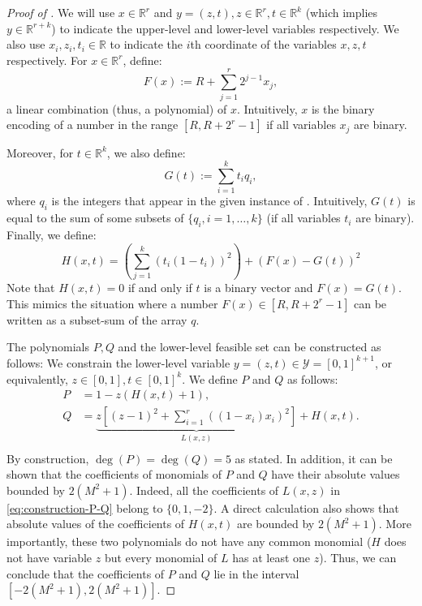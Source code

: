 \documentclass{article}
\newcommand*{\cY}{\mathcal{Y}}
\newcommand*{\RR}{\mathbb{R}}
\newcommand{\firstvar}{x}
\newcommand{\secondvar}{y}
\theoremstyle{plain}
\theoremstyle{definition}
\begin{document}
\begin{proof}[Proof of {}]
        We will use $x \in \RR^{r}$ and $y = (z, t), z \in \RR^r, t \in \RR^{k}$ (which implies $y \in \RR^{r + k}$) to indicate the upper-level and lower-level variables respectively. We also use $x_i, z_i, t_i \in \RR$ to indicate the $i$th coordinate of the variables $x, z, t$ respectively. For $x \in \RR^r$, define:
    \begin{equation*}
        \label{eq:binary_representation}
        F(x) := R + \sum_{j = 1}^r 2^{j-1}x_j,
    \end{equation*}
    a linear combination (thus, a polynomial) of $x$. Intuitively, ${x}$ is the binary {encoding} of a number in the range $[R, R + 2^r - 1]$ if all variables $x_j$ are binary. 
    
    Moreover, for $t \in \RR^k$, we also define:
    \begin{equation*}
        \label{eq:subset_representation}
        G(t) := \sum_{i = 1}^k t_iq_i,
    \end{equation*}
    where $q_i$ is the integers that appear in the given instance of . Intuitively, $G(t)$ is equal to the sum of some subsets of $\{q_i, i = 1, \ldots, k\}$ (if all variables $t_i$ are binary). Finally, we define:
    \begin{equation*}
        H(x,t) = \left(\sum_{j = 1}^k (t_i(1 - t_i))^2\right) + (F(x) - G(t))^2
    \end{equation*}
    Note that $H(x,t)=0$ if and only if $t$ is a binary vector and $F(x) = G(t)$. This mimics the situation where a number $F(x) \in [R, R + 2^r - 1]$ can be written as a subset-sum of the array $q$.
    
    The polynomials $P, Q$ and the lower-level feasible set can be constructed as follows: We constrain the lower-level variable $\secondvar = (z,t) \in \cY = [0,1]^{k+1}$, or equivalently, $z \in [0,1], t \in [0,1]^k$. 
    We define $P$ and $Q$ as follows:
    \begin{equation}
        \label{eq:construction-P-Q}
        \begin{aligned}
            P &= 1 - z(H(\firstvar,t) + 1),\\
            Q &= \underbrace{z\left[(z-1)^2 + \sum_{i = 1}^r \left((1 - x_i)x_i\right)^2\right]}_{L(x,z)} + H(\firstvar,t).\\
        \end{aligned}
    \end{equation}
    By construction, $\deg(P) = \deg(Q) = 5$ as stated. In addition, it can be shown that the coefficients of monomials of $P$ and $Q$ have their absolute values bounded by $2(M^2+1)$. Indeed, all the coefficients of $L(x,z)$ in \eqref{eq:construction-P-Q} belong to $\{0, 1, -2\}$. A direct calculation also shows that absolute values of the coefficients of $H(x,t)$ are bounded by $2(M^2 + 1)$. More importantly, these two polynomials do not have any common monomial ($H$ does not have variable $z$ but every monomial of $L$ has at least one $z$). Thus, we can conclude that the coefficients of $P$ and $Q$ lie in the interval $[-2(M^2 + 1), 2(M^2 + 1)]$. 


\end{proof}
\end{document}
